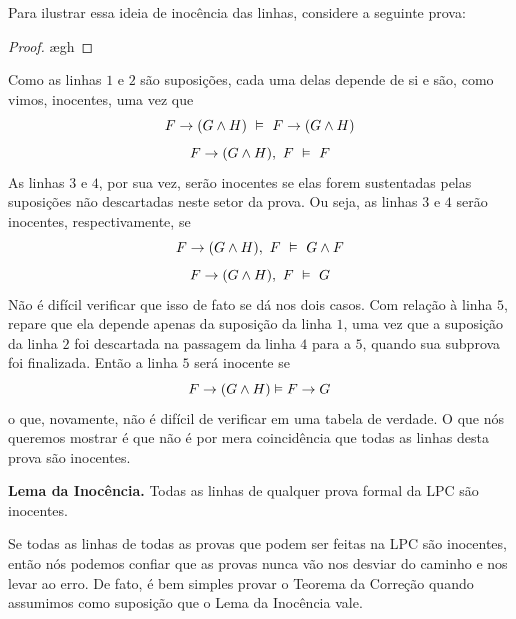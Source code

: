 Para ilustrar essa ideia de inocência das linhas, considere a seguinte prova:
	\begin{proof}
		\open
			\ae{gh}
		\close
	\end{proof}\noindent\noindent
Como as linhas $1$ e $2$ são suposições, cada uma delas depende de si e são, como vimos, inocentes, uma vez que
	$$F \eif (G \eand H) \ \entails \ F \eif (G \eand H)$$
	$$F \rightarrow (G \wedge H), \ F \ \vDash \ F$$ 
As linhas $3$ e $4$, por sua vez, serão inocentes se elas forem sustentadas pelas suposições não descartadas neste setor da prova.
Ou seja, as linhas $3$ e $4$ serão inocentes, respectivamente, se
	$$F \rightarrow (G \wedge H), \ F \ \vDash \ G \wedge F$$
	$$F \rightarrow (G \wedge H), \ F \ \vDash \ G$$
Não é difícil verificar que isso de fato se dá nos dois casos.
Com relação à linha $5$, repare que ela depende apenas da suposição da linha $1$, uma vez que a suposição da linha $2$ foi descartada na passagem da linha $4$ para a $5$, quando sua subprova foi finalizada.
Então a linha $5$ será inocente se
	$$F \rightarrow (G \wedge H) \vDash F \rightarrow G$$
o que, novamente, não é difícil de verificar em uma tabela de verdade.
O que nós queremos mostrar é que não é por mera coincidência que todas as linhas desta prova são inocentes.
	\begin{factoidboxe}\textbf{Lema da Inocência.}
		Todas as linhas de qualquer prova formal da LPC são inocentes.
	\end{factoidboxe}\noindent
Se todas as linhas de todas as provas que podem ser feitas na LPC são inocentes, então nós podemos confiar que as provas nunca vão nos desviar do caminho e nos levar ao erro.
De fato, é bem simples provar o Teorema da Correção quando assumimos como suposição que o Lema da Inocência vale.

